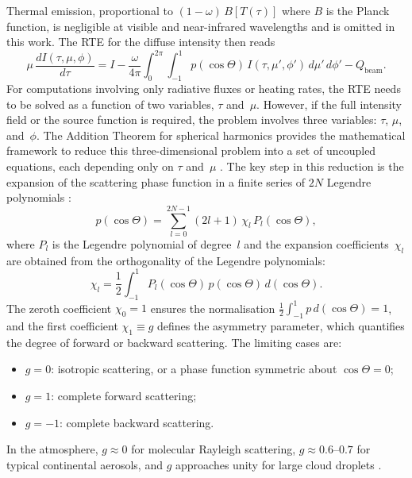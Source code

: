 \documentclass[a4paper, 11pt]{article}
\begin{document}
Thermal emission, proportional to $(1-\omega)\,B[T(\tau)]$ where $B$ is
the Planck function, is negligible at visible and near-infrared
wavelengths and is omitted in this work.  The RTE for the diffuse
intensity then reads
%
\begin{equation}
  \mu\,\frac{dI(\tau,\mu,\phi)}{d\tau}
  = I - \frac{\omega}{4\pi}\int_{0}^{2\pi}\!\int_{-1}^{1}
    p(\cos\Theta)\,I(\tau,\mu',\phi')\,d\mu'\,d\phi'
  - Q_{\text{beam}}.
  \label{eq:rte_diffuse}
\end{equation}
For computations involving only radiative fluxes or heating rates,
the RTE needs to be solved as a function of two variables, $\tau$
and~$\mu$.  However, if the full intensity field or the source
function is required, the problem involves three variables: $\tau$,
$\mu$, and~$\phi$.  The Addition Theorem for spherical harmonics
provides the mathematical framework to reduce this three-dimensional
problem into a set of uncoupled equations, each depending only on
$\tau$ and~$\mu$ \cite{thomas2002}.  The key step in this
reduction is the expansion of the scattering phase function in a
finite series of $2N$
Legendre polynomials \cite{chandrasekhar1950,thomas2002}:
%
\begin{equation}
  p(\cos\Theta)
  = \sum_{l=0}^{2N-1}(2l+1)\,\chi_l\,P_l(\cos\Theta),
  \label{eq:phase_legendre}
\end{equation}
%
where $P_l$ is the Legendre polynomial of degree~$l$ and the
expansion coefficients~$\chi_l$ are obtained from the orthogonality
of the Legendre polynomials:
%
\begin{equation}
  \chi_l
  = \frac{1}{2}\int_{-1}^{1}
    P_l(\cos\Theta)\,p(\cos\Theta)\,d(\cos\Theta).
  \label{eq:chi_l}
\end{equation}
%
The zeroth coefficient $\chi_0 = 1$ ensures the normalisation
$\frac{1}{2}\int_{-1}^{1}p\,d(\cos\Theta) = 1$, and the first
coefficient $\chi_1 \equiv g$ defines the asymmetry parameter, which
quantifies the degree of forward or backward scattering.  The
limiting cases are:
%
\begin{itemize}
  \item $g = 0$: isotropic scattering, or a phase function symmetric
        about $\cos\Theta = 0$;
  \item $g = 1$: complete forward scattering;
  \item $g = -1$: complete backward scattering.
\end{itemize}
%
In the atmosphere, $g \approx 0$ for molecular Rayleigh scattering,
$g \approx 0.6$--$0.7$ for typical continental aerosols, and $g$
approaches unity for large cloud droplets \cite{liou2002}.
\end{document}
